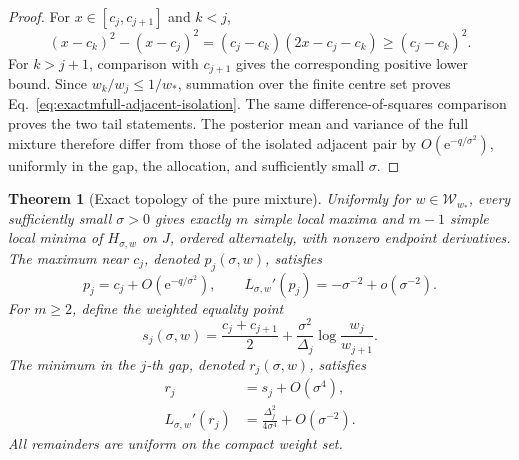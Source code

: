 \documentclass[aps,physrev,onecolumn,amsmath,amssymb,longbibliography]{revtex4-2}
\newcommand{\e}{\mathrm e}
\newtheorem{theorem}{Theorem}[section]
\begin{document}
\begin{proof}
For \(x\in[c_j,c_{j+1}]\) and \(k<j\),
\begin{equation}
 (x-c_k)^2-(x-c_j)^2
 =(c_j-c_k)(2x-c_j-c_k)\ge(c_j-c_k)^2.
 \label{eq:exactmfull-left-square-comparison}
\end{equation}
For \(k>j+1\), comparison with \(c_{j+1}\) gives the corresponding positive
lower bound.  Since \(w_k/w_j\le1/w_*\), summation over the finite centre set
proves Eq.~\eqref{eq:exactmfull-adjacent-isolation}.  The same
difference-of-squares comparison proves the two tail statements.  The
posterior mean and variance of the full mixture therefore differ from those
of the isolated adjacent pair by \(O(\e^{-q/\sigma^2})\), uniformly in the
gap, the allocation, and sufficiently small \(\sigma\).
\end{proof}

\begin{theorem}[Exact topology of the pure mixture]
\label{thm:exactmfull-pure-topology}
Uniformly for \(w\in\mathcal W_{w_*}\), every sufficiently small
\(\sigma>0\) gives exactly \(m\) simple local maxima and \(m-1\) simple local
minima of \(H_{\sigma,w}\) on \(J\), ordered alternately, with nonzero
endpoint derivatives.  The maximum near \(c_j\), denoted \(p_j(\sigma,w)\),
satisfies
\begin{equation}
 p_j=c_j+O(\e^{-q/\sigma^2}),
 \qquad L_{\sigma,w}'(p_j)
 =-\sigma^{-2}+o(\sigma^{-2}).
 \label{eq:exactmfull-peak-location}
\end{equation}
For \(m\ge2\), define the weighted equality point
\begin{equation}
 s_j(\sigma,w)
 =\frac{c_j+c_{j+1}}2
  +\frac{\sigma^2}{\Delta_j}\log\frac{w_j}{w_{j+1}}.
 \label{eq:exactmfull-weighted-crossover}
\end{equation}
The minimum in the \(j\)-th gap, denoted \(r_j(\sigma,w)\), satisfies
\begin{align}
 r_j&=s_j+O(\sigma^4),
 \label{eq:exactmfull-valley-location}\\
 L_{\sigma,w}'(r_j)
 &=\frac{\Delta_j^2}{4\sigma^4}+O(\sigma^{-2}).
 \label{eq:exactmfull-valley-curvature}
\end{align}
All remainders are uniform on the compact weight set.
\end{theorem}
\end{document}
